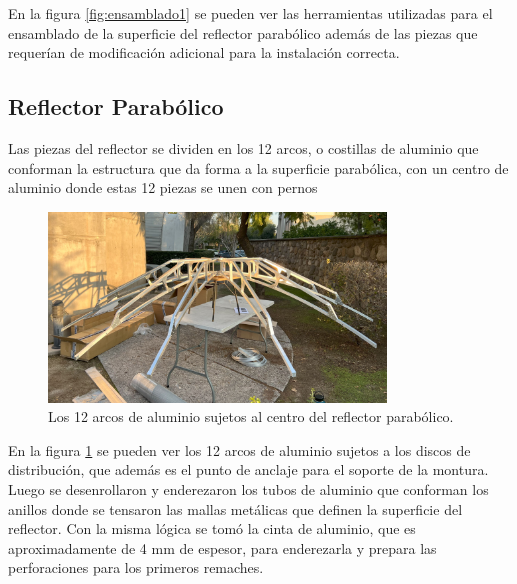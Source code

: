 En la figura \ref{fig:ensamblado1} se pueden ver las herramientas utilizadas para el ensamblado de la superficie del reflector parabólico además de las piezas que requerían de modificación adicional para la instalación correcta.\\

\subsection{Reflector Parabólico}

Las piezas del reflector se dividen en los 12 arcos, o costillas de aluminio que conforman la estructura que da forma a la superficie parabólica, con un centro de aluminio donde estas 12 piezas se unen con pernos\\

\begin{figure}
    \centering
    \includegraphics[width=0.8\textwidth]{img/estructura1}
    \caption{Los 12 arcos de aluminio sujetos al centro del reflector parabólico.}
    \label{fig:ensamble2}
\end{figure}

En la figura \ref{fig:ensamble2} se pueden ver los 12 arcos de aluminio sujetos a los discos de distribución, que además es el punto de anclaje para el soporte de la montura.\\

Luego se desenrollaron y enderezaron los tubos de aluminio que conforman los anillos donde se tensaron las mallas metálicas que definen la superficie del reflector. Con la misma lógica se tomó la cinta de aluminio, que es aproximadamente de 4 mm de espesor, para enderezarla y prepara las perforaciones para los primeros remaches.\\

